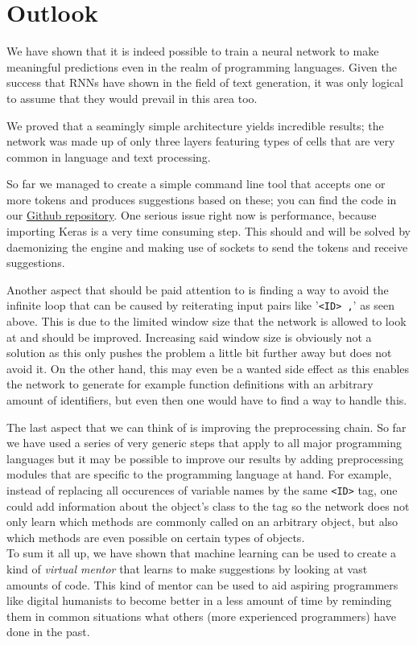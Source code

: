 \section{Outlook}
\label{sec:outlook}

    We have shown that it is indeed possible to train a neural network to make meaningful predictions
    even in the realm of programming languages. Given the success that RNNs have shown in the field
    of text generation, it was only logical to assume that they would prevail in this area too.

    We proved that a seamingly simple architecture yields incredible results; the network was made up
    of only three layers featuring types of cells that are very common in language and text processing.

    So far we managed to create a simple command line tool that accepts one or more tokens and produces
    suggestions based on these; you can find the code in our \href{https://github.com/fbrei/nn-autocomp}{Github repository}.
    One serious issue right now is performance, because importing Keras is a very time consuming
    step. This should and will be solved by daemonizing the engine and making use of sockets to
    send the tokens and receive suggestions.

    Another aspect that should be paid attention to is finding a way to avoid the infinite loop
    that can be caused by reiterating input pairs like '\verb|<ID> ,|' as seen above. This is
    due to the limited window size that the network is allowed to look at and should be improved.
    Increasing said window size is obviously not a solution as this only pushes the problem a little
    bit further away but does not avoid it. On the other hand, this may even be a wanted side effect
    as this enables the network to generate for example function definitions with an arbitrary amount
    of identifiers, but even then one would have to find a way to handle this.

    The last aspect that we can think of is improving the preprocessing chain. So far we have used
    a series of very generic steps that apply to all major programming languages but it may be
    possible to improve our results by adding preprocessing modules that are specific to the
    programming language at hand. For example, instead of replacing all occurences of variable names
    by the same \verb+<ID>+ tag, one could add information about the object's class to the tag so
    the network does not only learn which methods are commonly called on an arbitrary object, but also
    which methods are even possible on certain types of objects. \\

    To sum it all up, we have shown that machine learning can be used to create a kind of
    \textit{virtual mentor} that learns to make suggestions by looking at vast amounts of code.
    This kind of mentor can be used to aid aspiring programmers like digital humanists to become
    better in a less amount of time by reminding them in common situations what others (more experienced programmers)
    have done in the past.
